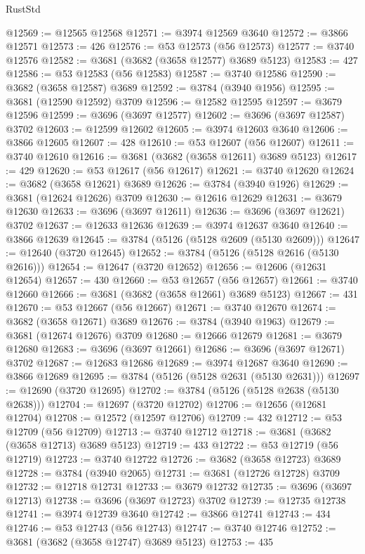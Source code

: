 \begin{lexlean}{RustStd}
\begin{coremodule}
@12569 := @12565 @12568
@12571 := @3974 @12569 @3640
@12572 := @3866 @12571
@12573 := 426
@12576 := @53 @12573 (@56 @12573)
@12577 := @3740 @12576
@12582 := @3681 (@3682 (@3658 @12577) @3689 @5123)
@12583 := 427
@12586 := @53 @12583 (@56 @12583)
@12587 := @3740 @12586
@12590 := @3682 (@3658 @12587) @3689
@12592 := @3784 (@3940 @1956)
@12595 := @3681 (@12590 @12592) @3709
@12596 := @12582 @12595
@12597 := @3679 @12596
@12599 := @3696 (@3697 @12577)
@12602 := @3696 (@3697 @12587) @3702
@12603 := @12599 @12602
@12605 := @3974 @12603 @3640
@12606 := @3866 @12605
@12607 := 428
@12610 := @53 @12607 (@56 @12607)
@12611 := @3740 @12610
@12616 := @3681 (@3682 (@3658 @12611) @3689 @5123)
@12617 := 429
@12620 := @53 @12617 (@56 @12617)
@12621 := @3740 @12620
@12624 := @3682 (@3658 @12621) @3689
@12626 := @3784 (@3940 @1926)
@12629 := @3681 (@12624 @12626) @3709
@12630 := @12616 @12629
@12631 := @3679 @12630
@12633 := @3696 (@3697 @12611)
@12636 := @3696 (@3697 @12621) @3702
@12637 := @12633 @12636
@12639 := @3974 @12637 @3640
@12640 := @3866 @12639
@12645 := @3784 (@5126 (@5128 @2609 (@5130 @2609)))
@12647 := @12640 (@3720 @12645)
@12652 := @3784 (@5126 (@5128 @2616 (@5130 @2616)))
@12654 := @12647 (@3720 @12652)
@12656 := @12606 (@12631 @12654)
@12657 := 430
@12660 := @53 @12657 (@56 @12657)
@12661 := @3740 @12660
@12666 := @3681 (@3682 (@3658 @12661) @3689 @5123)
@12667 := 431
@12670 := @53 @12667 (@56 @12667)
@12671 := @3740 @12670
@12674 := @3682 (@3658 @12671) @3689
@12676 := @3784 (@3940 @1963)
@12679 := @3681 (@12674 @12676) @3709
@12680 := @12666 @12679
@12681 := @3679 @12680
@12683 := @3696 (@3697 @12661)
@12686 := @3696 (@3697 @12671) @3702
@12687 := @12683 @12686
@12689 := @3974 @12687 @3640
@12690 := @3866 @12689
@12695 := @3784 (@5126 (@5128 @2631 (@5130 @2631)))
@12697 := @12690 (@3720 @12695)
@12702 := @3784 (@5126 (@5128 @2638 (@5130 @2638)))
@12704 := @12697 (@3720 @12702)
@12706 := @12656 (@12681 @12704)
@12708 := @12572 (@12597 @12706)
@12709 := 432
@12712 := @53 @12709 (@56 @12709)
@12713 := @3740 @12712
@12718 := @3681 (@3682 (@3658 @12713) @3689 @5123)
@12719 := 433
@12722 := @53 @12719 (@56 @12719)
@12723 := @3740 @12722
@12726 := @3682 (@3658 @12723) @3689
@12728 := @3784 (@3940 @2065)
@12731 := @3681 (@12726 @12728) @3709
@12732 := @12718 @12731
@12733 := @3679 @12732
@12735 := @3696 (@3697 @12713)
@12738 := @3696 (@3697 @12723) @3702
@12739 := @12735 @12738
@12741 := @3974 @12739 @3640
@12742 := @3866 @12741
@12743 := 434
@12746 := @53 @12743 (@56 @12743)
@12747 := @3740 @12746
@12752 := @3681 (@3682 (@3658 @12747) @3689 @5123)
@12753 := 435

\end{coremodule}
\end{lexlean}
